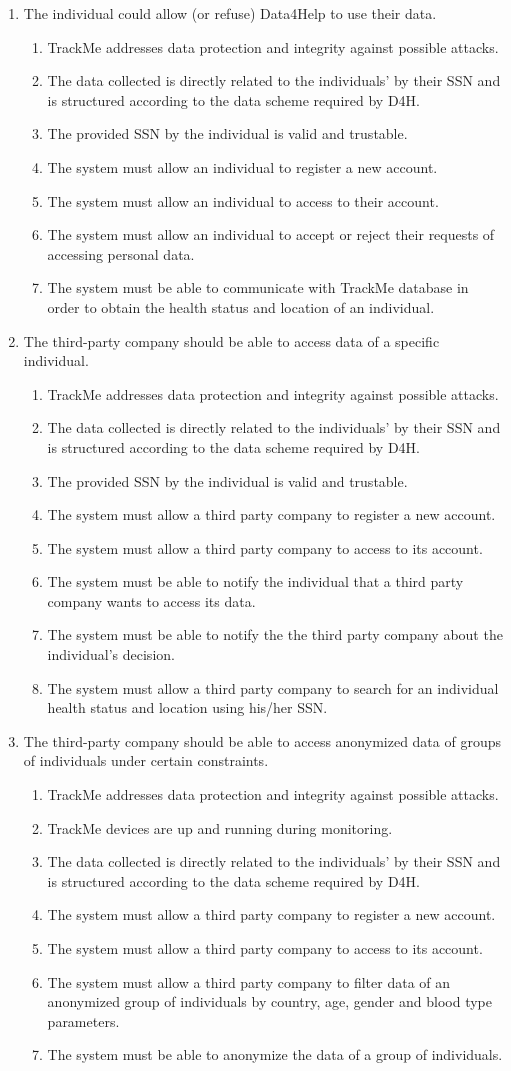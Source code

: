 \documentclass[a4paper, hidelinks, 12pt]{report}
\newcommand\requirement[1]{\item[{[R#1]}] }
\newcommand\goal[1]{\item[{[G#1]}] }
\newcommand\assumption[1]{\item[{[D#1]}] }
\begin{document}
	\begin{enumerate}
		\goal{1} The individual could allow (or refuse) Data4Help to use their data.
		\begin{enumerate}
			\assumption{2} TrackMe addresses data protection and integrity against possible attacks.
			\assumption{4} The data collected is directly related to the individuals' by their SSN and is structured according to the data scheme required by D4H.
			\assumption{5} The provided SSN by the individual is valid and trustable.
			\requirement{1} The system must allow an individual to register a new account.
			\requirement{2} The system must allow an individual to access to their account.
			\requirement{3} The system must allow an individual to accept or reject their requests of accessing personal data.
			\requirement{4} The system must be able to communicate with TrackMe database in order to obtain the health status and location of an individual.
		\end{enumerate}
		
		\goal{2} The third-party company should be able to access data of a specific individual.
		\begin{enumerate}
			\assumption{2} TrackMe addresses data protection and integrity against possible attacks.
			\assumption{4} The data collected is directly related to the individuals' by their SSN and is structured according to the data scheme required by D4H.
			\assumption{5} The provided SSN by the individual is valid and trustable.
			\requirement{5} The system must allow a third party company to register a new account.
			\requirement{6} The system must allow a third party company to access to its account.
			\requirement{7} The system must be able to notify the individual that a third party company wants to access its data.
			\requirement{7.1} The system must be able to notify the the third party company about the individual's decision.
			\requirement{8} The system must allow a third party company to search for an individual health status and location using his/her SSN.
		\end{enumerate}
		
		\goal{3} The third-party company should be able to access anonymized data of groups of individuals under certain constraints.
		\begin{enumerate}
			\assumption{2} TrackMe addresses data protection and integrity against possible attacks.
			\assumption{3} TrackMe devices are up and running during monitoring.
			\assumption{4} The data collected is directly related to the individuals' by their SSN and is structured according to the data scheme required by D4H.
			\requirement{5} The system must allow a third party company to register a new account.
			\requirement{6} The system must allow a third party company to access to its account.
			\requirement{9} The system must allow a third party company to filter data of an anonymized group of individuals by country, age, gender and blood type parameters.
			\requirement{10} The system must be able to anonymize the data of a group of individuals.
		\end{enumerate}
		

\end{enumerate}
\end{document}
